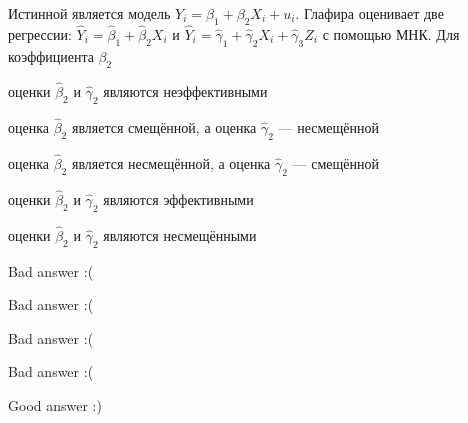 
\begin{question}
Истинной является модель \(Y_i = \beta_1 + \beta_2 X_i + u_i\). Глафира оценивает две регрессии: \(\hat Y_i = \hat \beta_1 + \hat \beta_2X_i\) и \(\hat Y_i = \hat \gamma_1 + \hat \gamma_2 X_i + \hat \gamma_3 Z_i\) с помощью МНК. Для коэффициента \(\beta_2\)
\begin{answerlist}
  \item оценки \(\hat \beta_2\) и \(\hat\gamma_2\) являются неэффективными
  \item оценка \(\hat \beta_2\) является смещённой, а оценка \(\hat\gamma_2\) --- несмещённой
  \item оценка \(\hat \beta_2\) является несмещённой, а оценка \(\hat\gamma_2\) --- смещённой
  \item оценки \(\hat \beta_2\) и \(\hat\gamma_2\) являются эффективными
  \item оценки \(\hat \beta_2\) и \(\hat\gamma_2\) являются несмещёнными
\end{answerlist}
\end{question}

\begin{solution}
\begin{answerlist}
  \item Bad answer :(
  \item Bad answer :(
  \item Bad answer :(
  \item Bad answer :(
  \item Good answer :)
\end{answerlist}
\end{solution}

